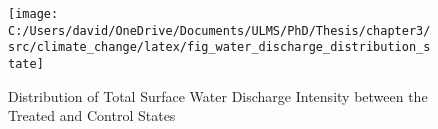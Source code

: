 \begin{figure}[H]
    \centering
    \texttt{[image: C:/Users/david/OneDrive/Documents/ULMS/PhD/Thesis/chapter3/src/climate\_change/latex/fig\_water\_discharge\_distribution\_state]}
    \caption{Distribution of Total Surface Water Discharge Intensity between the Treated and Control States}
    \label{fig:water-discharge-distribution}
\end{figure}